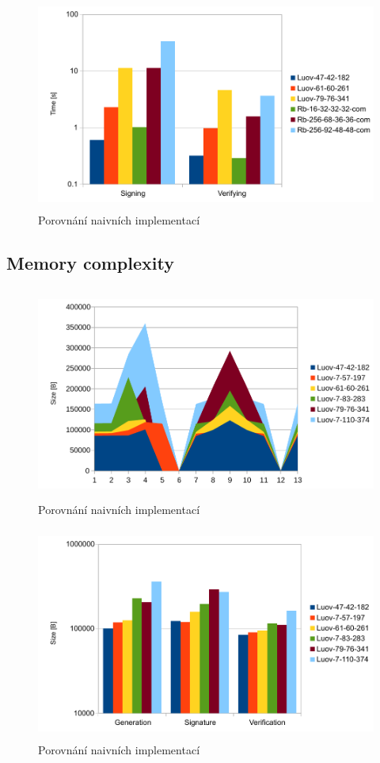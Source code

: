 \documentclass[thesis=M,english]{FITthesis}[2019/12/23]
\begin{document}
\begin{figure}[H]
\centering
\includegraphics[width=13cm,height=7cm]{images/time-both.pdf}
\caption{Porovnání naivních implementací}
\label{time-both}
\end{figure}

\subsection{Memory complexity}
\begin{figure}[H]
\centering
\includegraphics[width=13cm,height=7cm]{images/mem-luov0.pdf}
\caption{Porovnání naivních implementací}
\label{mem-luov0}
\end{figure}

\begin{figure}[H]
\centering
\includegraphics[width=13cm,height=7cm]{images/mem-luov.pdf}
\caption{Porovnání naivních implementací}
\label{mem-luov}
\end{figure}
\end{document}
